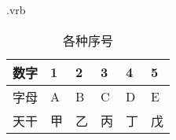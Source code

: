 \begin{VerbatimOut}{\jobname.vrb}
\begin{longtable}{|c|X|X|X|X|X|}
\caption{各种序号} \\ \hline
\endfirsthead
\hline
\endhead
\hline
\endfoot
  数字 & 1 & 2 & 3 & 4 & 5 \\ \hline
  字母 & A & B & C & D & E \\ \hline
  天干 & 甲 & 乙 & 丙 & 丁 & 戊 \\
\end{longtable}
\end{VerbatimOut}
